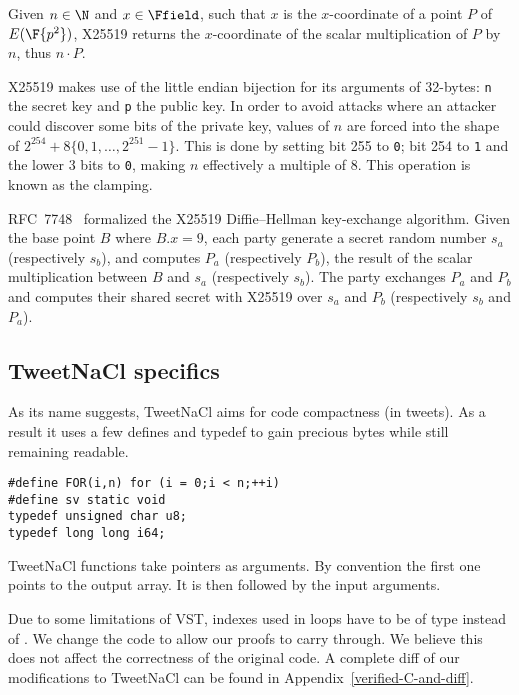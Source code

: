 Given $n \in \N$ and $x \in \Ffield$, such that $x$ is the $x$-coordinate of
a point $P$ of $E(\F{p^2})$, X25519 returns the $x$-coordinate of the
scalar multiplication of $P$ by $n$, thus $n \cdot P$.

X25519 makes use of the little endian bijection for its arguments of 32-bytes:
\texttt{n} the secret key and \texttt{p} the public key.
In order to avoid attacks where an attacker
could discover some bits of the private key, values of $n$ are forced into the
shape of $2^{254} + 8\{0,1,\ldots,2^{251}-1\}$. This is done by setting bit 255
to \texttt{0}; bit 254 to \texttt{1} and the lower 3 bits to \texttt{0},
making $n$ effectively a multiple of 8. This operation is known as the clamping.

RFC~7748~\cite{rfc7748} formalized the X25519 Diffie–Hellman key-exchange algorithm.
Given the base point $B$ where $B.x=9$, each party generate a secret random number
$s_a$ (respectively $s_b$), and computes $P_a$ (respectively $P_b$), the result
of the scalar multiplication between $B$ and $s_a$ (respectively $s_b$).
The party exchanges $P_a$ and $P_b$ and computes their shared secret with X25519
over $s_a$ and $P_b$ (respectively $s_b$ and $P_a$).





\subsection{TweetNaCl specifics}
\label{subsec:Number-TweetNaCl}

As its name suggests, TweetNaCl aims for code compactness (in tweets).
As a result it uses a few defines and typedef to gain precious bytes while
still remaining readable.
\begin{lstlisting}[language=Ctweetnacl]
#define FOR(i,n) for (i = 0;i < n;++i)
#define sv static void
typedef unsigned char u8;
typedef long long i64;
\end{lstlisting}

TweetNaCl functions take pointers as arguments. By convention the first one
points to the output array. It is then followed by the input arguments.

Due to some limitations of VST, indexes used in  loops have to be
of type  instead of . We change the code to allow our
proofs to carry through. We believe this does not affect the correctness of the
original code. A complete diff of our modifications to TweetNaCl can be found in
Appendix~\ref{verified-C-and-diff}.





